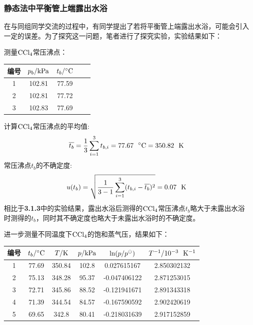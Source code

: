 \documentclass[12pt]{article}
\begin{document}
		\subsubsection{静态法中平衡管上端露出水浴}
		在与同组同学交流的过程中，有同学提出了若将平衡管上端露出水浴，可能会引入一定的误差。为了探究这一问题，笔者进行了探究实验，实验结果如下：\par
		测量$\rm CCl_{4}$常压沸点：
		\begin{table}[h]
			\centering
			\begin{tabular}{ccccc}
				\toprule
				编号 & $p_{b}/{\rm kPa}$& $t_{b}/{\rm ^{\circ}C}$ \\
				\midrule
				1 & 102.81 & 77.59\\
				2 & 102.81 & 77.72\\
				3 & 102.83 & 77.69\\
				\bottomrule
			\end{tabular}
		\end{table}
		\par
		计算$\rm CCl_{4}$常压沸点的平均值:
		$$
			\overline{t_{b}}=\frac{1}{3}\sum_{i=1}^{3}t_{b,i}=77.67\ \ {\rm ^{\circ}C}= 350.82\ \ {\rm K}
		$$
		常压沸点$t_{b}$的不确定度:
		$$
			u(t_{b})=\sqrt{\frac{1}{3-1}\sum_{i=1}^{3}(t_{b,i}-\overline{t_{b}})^{2}}=0.07\ \ {\rm K}
		$$
		相比于\textbf{3.1.3}中的实验结果，露出水浴后测得的$\rm CCl_{4}$常压沸点$t_{b}$略大于未露出水浴时测得的$t_{b}$，同时其不确定度也略大于未露出水浴时的不确定度。
		\par
		进一步测量不同温度下$\rm CCl_{4}$的饱和蒸气压，结果如下：
		\begin{table}[h]
			\centering
			\begin{tabular}{cccccc}
				\toprule
				编号 & $t_{b}/{\rm ^{\circ}C}$& $T/{\rm K}$ & $p/{\rm kPa}$ & ${\rm ln}(p/p^{\ominus})$ & $T^{-1}/{\rm 10^{-3}\ \ K^{-1}}$\\
				\midrule
				1 & 77.69 & 350.84 & 102.8 & 0.027615167  & 2.850302132 \\
				2 & 75.13 & 348.28 & 95.37 & -0.047406122 & 2.871253015 \\
				3 & 72.71 & 345.86 & 88.52 & -0.121941671 & 2.891343318 \\
				4 & 71.39 & 344.54 & 84.57 & -0.167590592 & 2.902420619 \\
				5 & 69.65 & 342.8  & 80.41 & -0.218031639 & 2.917152859 \\
				\bottomrule
			\end{tabular}
		\end{table}
\end{document}
